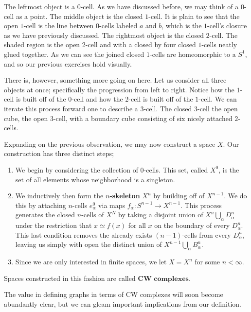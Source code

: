 \documentclass[12pt,oneside]{amsbook}
\begin{document}
The leftmost object is a $0$-cell. As we have discussed before, we may think of a $0$-cell as a point. The middle object is the closed $1$-cell. It is plain to see that the open $1$-cell is the line between $0$-cells labeled $a$ and $b$, which is the $1$-cell's closure as we have previously discussed. The rightmost object is the closed $2$-cell. The shaded region is the open $2$-cell and with a closed by four closed $1$-cells neatly glued together. As we can see the joined closed $1$-cells are homeomorphic to a $S^1$, and so our previous exercises hold visually.

There is, however, something more going on here. Let us consider all three objects at once; specifically the progression from left to right. Notice how the $1$-cell is built off of the $0$-cell and how the $2$-cell is built off of the $1$-cell. We can iterate this process forward one to describe a $3$-cell. The closed $3$-cell the open cube, the open $3$-cell, with a boundary cube consisting of six nicely attached $2$-cells. 

Expanding on the previous observation, we may now construct a space $X$.  Our construction has three distinct steps;
\begin{enumerate}
\item We begin by considering the collection of $0$-cells. This set, called $X^0$, is the set of all elements whose neighborhood is a singleton.
\item We inductively then form the \textbf{$n$-skeleton} $X^n$ by building off of $X^{n-1}$. We do this by attaching $n$-cells $e^0_\alpha$ via maps $f_\alpha \colon S^{n-1} \rightarrow X^{n-1}$. This process generates the closed $n$-cells of $X^N$ by taking a disjoint union of $X^n \bigcup_\alpha D^n_\alpha$ under the restriction that $x \simeq f(x)$ for all $x$ on the boundary of every $D^n_\alpha$. This last condition removes the already exists $(n-1)$-cells from every $D^n_\alpha$, leaving us simply with open the distinct union of $X^{n-1}\bigcup_\alpha B^n_\alpha$. %
\item Since we are only interested in finite spaces, we let $X=X^n$ for some $n<\infty$.
\end{enumerate}

Spaces constructed in this fashion are called $\textbf{CW complexes}$\cite{at}. 

The value in defining graphs in terms of CW complexes will soon become abundantly clear, but we can gleam important implications from our definition. 
\end{document}
